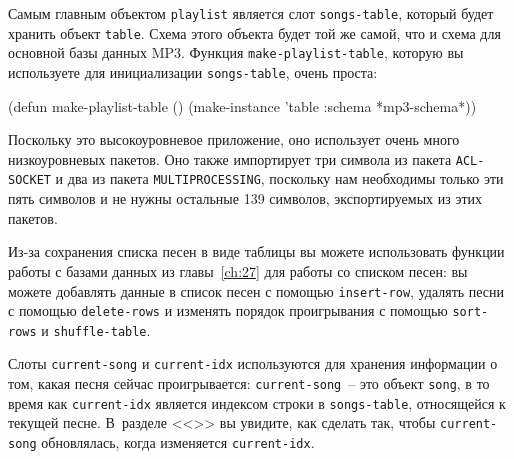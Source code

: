 Самым главным объектом \lstinline{playlist} является слот \lstinline{songs-table}, который будет
хранить объект \lstinline{table}.  Схема этого объекта будет той же самой, что и схема для
основной базы данных MP3.  Функция \lstinline{make-playlist-table}, которую вы используете для
инициализации \lstinline{songs-table}, очень проста:

\begin{myverb}
(defun make-playlist-table ()
  (make-instance 'table :schema *mp3-schema*))
\end{myverb}


Поскольку это высокоуровневое приложение, оно использует очень много низкоуровневых
пакетов.  Оно также импортирует три символа из пакета \lstinline{ACL-SOCKET} и два из пакета
\lstinline{MULTIPROCESSING}, поскольку нам необходимы только эти пять символов и не нужны
остальные 139 символов, экспортируемых из этих пакетов.

Из-за сохранения списка песен в виде таблицы вы можете использовать функции работы с
базами данных из главы~\ref{ch:27} для работы со списком песен: вы можете добавлять данные
в список песен с помощью \lstinline{insert-row}, удалять песни с помощью \lstinline{delete-rows} и
изменять порядок проигрывания с помощью \lstinline{sort-rows} и \lstinline{shuffle-table}.

Слоты \lstinline{current-song} и \lstinline{current-idx} используются для хранения информации о том,
какая песня сейчас проигрывается: \lstinline{current-song}~-- это объект \lstinline{song}, в то
время как \lstinline{current-idx} является индексом строки в \lstinline{songs-table}, относящейся к
текущей песне. В~разделе <<>> вы увидите, как сделать так, чтобы
\lstinline{current-song} обновлялась, когда изменяется \lstinline{current-idx}.

